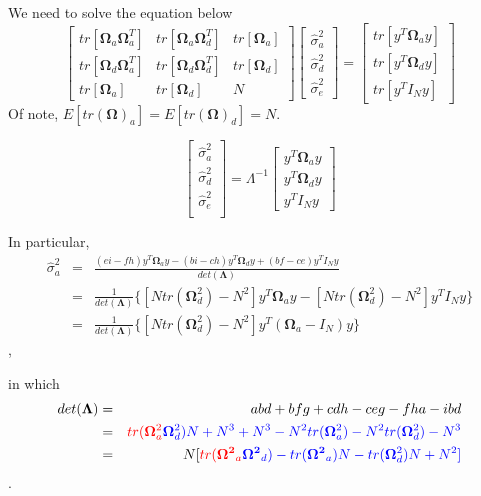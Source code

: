 \documentclass[]{article}
\begin{document}
We need to solve the equation below \[
\begin{bmatrix} 
tr[\mathbf{\Omega}_a\mathbf{\Omega}_a^T] & tr[\mathbf{\Omega}_a\mathbf{\Omega}_d^T]& tr[\mathbf{\Omega}_a] \\
tr[\mathbf{\Omega}_d\mathbf{\Omega}_a^T] & tr[\mathbf{\Omega}_d\mathbf{\Omega}_d^T] & tr[\mathbf{\Omega}_d] \\
tr[\mathbf{\Omega}_a] & tr[\mathbf{\Omega}_d] & N \end{bmatrix} \left[ \begin{array}{c} \hat{\sigma}^2_a \\ 
\hat{\sigma}^2_d \\
\hat{\sigma}^2_e \end{array} \right] = 
\left[ \begin{array}{c} tr[y^T\mathbf{\Omega}_ay] \\ tr[y^T\mathbf{\Omega}_dy]\\tr[y^TI_Ny] \end{array} \right] 
\] Of note, \(E[tr(\mathbf{\Omega})_a]=E[tr(\mathbf{\Omega})_d]=N\).

\[
\left[ \begin{array}{c}
\hat{\sigma}^2_a \\
\hat{\sigma}^2_d \\
\hat{\sigma}^2_e \\
\end{array}
\right ]=\Lambda^{-1}
\left[ \begin{array}{c} y^T\mathbf{\Omega}_ay \\ y^T\mathbf{\Omega}_dy\\ y^TI_Ny \end{array} \right] 
\]

In particular, \[
\begin{align}
\hat{\sigma}^2_a&=&\frac{(ei-fh)y^T\mathbf{\Omega}_ay-(bi-ch)y^T\mathbf{\Omega}_dy+(bf-ce)y^TI_Ny}{det(\mathbf{\Lambda})}\\
&=&\frac{1}{det(\mathbf{\Lambda})}\{[Ntr(\mathbf \Omega^2_d)-N^2]y^T\mathbf{\Omega}_ay-[Ntr(\mathbf \Omega^2_d)-N^2]y^TI_Ny\}\\
&=&\frac{1}{det(\mathbf{\Lambda})}\{[Ntr(\mathbf \Omega^2_d)-N^2]y^T(\mathbf{\Omega}_a-I_N)y\}
\end{align}
\],

in which \[
\begin{align}
det(\mathbf{\Lambda})&=&abd+bfg+cdh-ceg-fha-ibd\\
&=&\color{red}{tr(\mathbf{\Omega}^2_a}\color{blue}{\mathbf{\Omega}^2_d})N+N^3+N^3-N^2tr(\mathbf{\Omega}^2_a)-N^2tr(\mathbf{\Omega}^2_d)-N^3\\
&=&N[\color{red}{tr(\mathbf{\Omega^2}_a} \color{blue}{\mathbf{\Omega^2}_d)}-tr(\mathbf{\Omega^2}_a)N-tr(\mathbf{\Omega}^2_d)N+N^2]
\end{align}
\].
\end{document}
